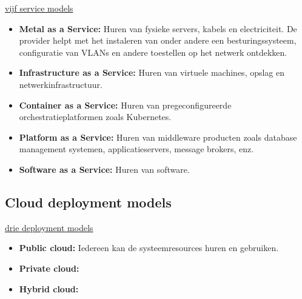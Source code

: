 	\underline{vijf service models}
	\begin{itemize}
		\item[\info] \textbf{Metal as a Service:} Huren van fysieke servers, kabels en electriciteit. De provider helpt met het instaleren van onder andere een besturingssysteem, configuratie van VLANs en andere toestellen op het netwerk ontdekken.
		\item[\info] \textbf{Infrastructure as a Service:} Huren van virtuele machines, opslag en netwerkinfrastructuur. 
		\item[\info] \textbf{Container as a Service:} Huren van pregeconfigureerde orchestratieplatformen zoals Kubernetes.
		\item[\info] \textbf{Platform as a Service:} Huren van middleware producten zoals database management systemen, applicatieservers, message brokers, enz. 
		\item[\info] \textbf{Software as a Service:} Huren van software.
	\end{itemize}

	\subsection{Cloud deployment models}
	\underline{drie deployment models}
	\begin{itemize}
		\item[\info] \textbf{Public cloud:} Iedereen kan de systeemresources huren en gebruiken. 
		\item[\info] \textbf{Private cloud:}
		\item[\info] \textbf{Hybrid cloud:}
	\end{itemize}

